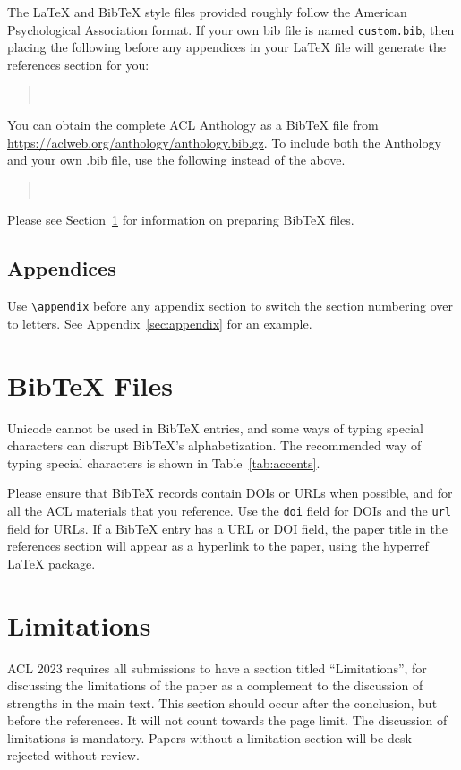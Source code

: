 \documentclass[11pt]{article}
\begin{document}
The \LaTeX{} and Bib\TeX{} style files provided roughly follow the American Psychological Association format.
If your own bib file is named \texttt{custom.bib}, then placing the following before any appendices in your \LaTeX{} file will generate the references section for you:
\begin{quote}
\begin{verbatim}


\end{verbatim}
\end{quote}
You can obtain the complete ACL Anthology as a Bib\TeX{} file from \url{https://aclweb.org/anthology/anthology.bib.gz}.
To include both the Anthology and your own .bib file, use the following instead of the above.
\begin{quote}
\begin{verbatim}


\end{verbatim}
\end{quote}
Please see Section~\ref{sec:bibtex} for information on preparing Bib\TeX{} files.

\subsection{Appendices}

Use \verb|\appendix| before any appendix section to switch the section numbering over to letters. See Appendix~\ref{sec:appendix} for an example.

\section{Bib\TeX{} Files}
\label{sec:bibtex}

Unicode cannot be used in Bib\TeX{} entries, and some ways of typing special characters can disrupt Bib\TeX's alphabetization. The recommended way of typing special characters is shown in Table~\ref{tab:accents}.

Please ensure that Bib\TeX{} records contain DOIs or URLs when possible, and for all the ACL materials that you reference.
Use the \verb|doi| field for DOIs and the \verb|url| field for URLs.
If a Bib\TeX{} entry has a URL or DOI field, the paper title in the references section will appear as a hyperlink to the paper, using the hyperref \LaTeX{} package.



\section*{Limitations}
ACL 2023 requires all submissions to have a section titled ``Limitations'', for discussing the limitations of the paper as a complement to the discussion of strengths in the main text. This section should occur after the conclusion, but before the references. It will not count towards the page limit.
The discussion of limitations is mandatory. Papers without a limitation section will be desk-rejected without review.
\end{document}
